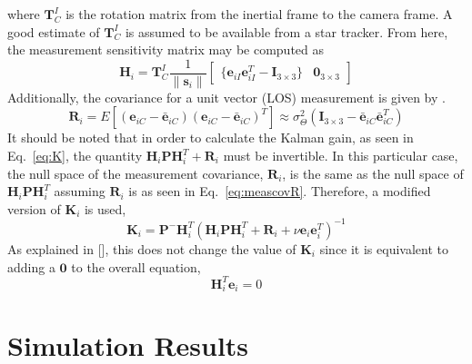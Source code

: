 \documentclass[]{aiaa-tc}%
\begin{document}
%
where $\textbf{T}_C^I$ is the rotation matrix from the inertial frame to the camera frame.  A good estimate of $\textbf{T}_{C}^I$  is assumed to be available from a star tracker.  From here, the measurement sensitivity matrix may be computed as
%
\begin{equation}
\label{eq:H}
\textbf{H}_{i}=\textbf{T}_{C}^I\frac{1}{\|\textbf{s}_i\|}
\left[\begin{matrix}
\{\textbf{e}_{iI}\textbf{e}_{iI}^T-\textbf{I}_{3\times3}\} & \textbf{0}_{3\times3}
\end{matrix}\right]
\end{equation}
%
Additionally, the covariance for a unit vector (LOS) measurement is given by \cite{Shuster:1981}.
\begin{equation}\label{eq:meascovR}
	\textbf{R}_{i}=E[(\textbf{e}_{iC}-\bar{\textbf{e}}_{iC})(\textbf{e}_{iC}-\bar{\textbf{e}}_{iC})^T]\approx\sigma_\Theta^2(\textbf{I}_{3\times3}-\bar{\textbf{e}}_{iC}\bar{\textbf{e}}_{iC}^T)
\end{equation}
It should be noted that in order to calculate the Kalman gain, as seen in Eq.~\ref{eq:K}, the quantity $\textbf{H}_i\textbf{P}\textbf{H}_i^T+\textbf{R}_i$ must be invertible.  In this particular case, the null space of the measurement covariance, $\textbf{R}_{i}$, is the same as the null space of $\textbf{H}_i\textbf{P}\textbf{H}_i^T$ assuming $\textbf{R}_i$ is as seen in Eq.~\ref{eq:meascovR}.  Therefore, a modified version of $\textbf{K}_i$ is used,
%
\begin{equation} \label{eq:Knew}
\textbf{K}_i=\textbf{P}^-\textbf{H}_i^T(\textbf{H}_i\textbf{P}\textbf{H}_i^T+\textbf{R}_i+\nu\textbf{e}_i\textbf{e}_i^T)^{-1}
\end{equation}
%
As explained in [], this does not change the value of $\textbf{K}_i$ since it is equivalent to adding a $\textbf{0}$ to the overall equation,
%
\begin{equation} \label{eq:Htranse}
\textbf{H}_i^T\textbf{e}_i=0
\end{equation}
%


\section{Simulation Results}
\end{document}
